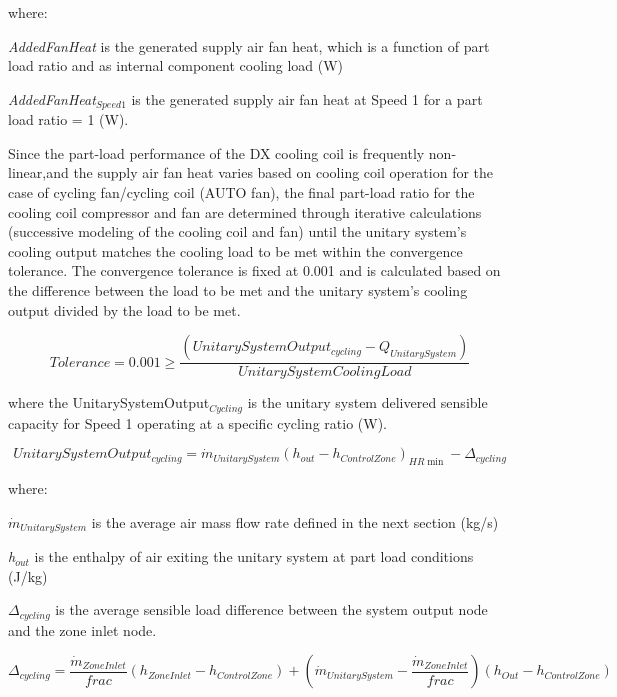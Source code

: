 where:

\emph{AddedFanHeat} is the generated supply air fan heat, which is a function of part load ratio and as internal component cooling load (W)

\emph{AddedFanHeat\(_{Speed1}\)} is the generated supply air fan heat at Speed 1 for a part load ratio = 1 (W).

Since the part-load performance of the DX cooling coil is frequently non-linear,and the supply air fan heat varies based on cooling coil operation for the case of cycling fan/cycling coil (AUTO fan), the final part-load ratio for the cooling coil compressor and fan are determined through iterative calculations (successive modeling of the cooling coil and fan) until the unitary system's cooling output matches the cooling load to be met within the convergence tolerance. The convergence tolerance is fixed at 0.001 and is calculated based on the difference between the load to be met and the unitary system's cooling output divided by the load to be met.

\begin{equation}
Tolerance = 0.001 \ge \frac{{\left( {UnitarySystemOutpu{t_{cycling}} - {Q_{UnitarySystem}}} \right)}}{{UnitarySystemCoolingLoad}}
\end{equation}

where the UnitarySystemOutput\(_{Cycling}\) is the unitary system delivered sensible capacity for Speed 1 operating at a specific cycling ratio (W).

\begin{equation}
UnitarySystemOutpu{t_{cycling}} = {\dot{m}_{UnitarySystem}}{\left( {{h_{out}} - {h_{ControlZone}}} \right)_{HR\min }} - {\Delta_{cycling}}
\end{equation}

where:

\({\dot m{_{UnitarySystem}}}\) is the average air mass flow rate defined in the next section (kg/s)

\emph{h\(_{out}\)} is the enthalpy of air exiting the unitary system at part load conditions (J/kg)

\(\Delta_{cycling}\) is the average sensible load difference between the system output node and the zone inlet node.

\begin{equation}
{\Delta_{cycling}} = \frac{\dot{m}_{ZoneInlet}}{frac} \left( {{h_{ZoneInlet}} - {h_{ControlZone}}} \right) + \left( {\dot{m}_{UnitarySystem}} - \frac{\dot{m}_{ZoneInlet}}{frac} \right) \left( {{h_{Out}} - {h_{ControlZone}}} \right)
\end{equation}

